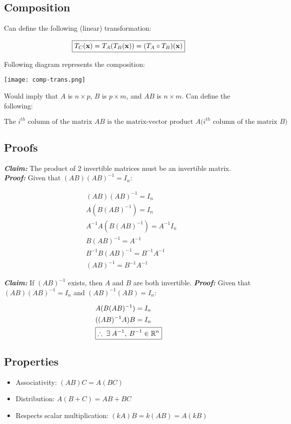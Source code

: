 \subsection{Composition}

Can define the following (linear) transformation:

\[\boxed{T_C(\textbf{x})=T_A(T_B(\textbf{x}))=(T_A\circ T_B)(\textbf{x})}\]

Following diagram represents the composition:

\begin{center}
    \texttt{[image: comp-trans.png]}
\end{center}

Would imply that $A$ is $n\times p$, $B$ is $p\times m$, and $AB$ is $n\times m$.
Can define the following:

\[\boxed{\text{The $i^{th}$ column of the matrix $AB$ is the matrix-vector product $A$($i^{th}$ column of the matrix $B$)}}\]

\subsection{Proofs}

\textbf{\textit{Claim:}} The product of 2 invertible matrices must be an invertible matrix.\newline
\textbf{\textit{Proof:}} Given that $(AB)(AB)^{-1}=I_n$:

\begin{align*}
    &(AB)(AB)^{-1}=I_n\\
    &A(B(AB)^{-1})=I_n\\
    &A^{-1}A(B(AB)^{-1})=A^{-1}I_n\\ 
    &B(AB)^{-1}=A^{-1}\\ 
    &B^{-1}B(AB)^{-1}=B^{-1}A^{-1}\\
    &(AB)^{-1}=B^{-1}A^{-1}
\end{align*}

\noindent\textbf{\textit{Claim:}} If $(AB)^{-1}$ exists, then $A$ and $B$ are both invertible.\newline
\textbf{\textit{Proof:}} Given that $(AB)(AB)^{-1}=I_n$ and $(AB)^{-1}(AB)=I_n$:

\begin{align*}
    &A(B(AB)^{-1})=I_n\\ 
    &((AB)^{-1}A)B=I_n\\
    &\boxed{\therefore\;\exists\;A^{-1},\:B^{-1}\in \mathbb{R}^n}
\end{align*}

\subsection{Properties}

\begin{itemize}
    \item Associativity: $(AB)C=A(BC)$
    \item Distribution: $A(B+C)=AB+BC$
    \item Respects scalar multiplication: $(kA)B=k(AB)=A(kB)$ 
\end{itemize}
